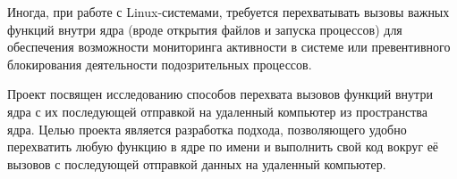 \Introduction

Иногда, при работе с Linux-системами, требуется перехватывать вызовы важных функций внутри ядра (вроде открытия файлов и запуска процессов) для обеспечения возможности мониторинга активности в системе или превентивного блокирования деятельности подозрительных процессов.

Проект посвящен исследованию способов перехвата вызовов функций внутри ядра с их последующей отправкой на удаленный компьютер из пространства ядра. Целью проекта является разработка подхода, позволяющего удобно перехватить любую функцию в ядре по имени и выполнить свой код вокруг её вызовов с последующей отправкой данных на удаленный компьютер.